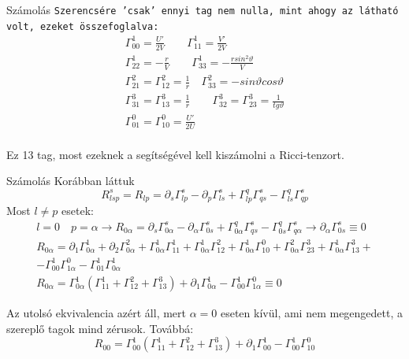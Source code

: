 \documentclass[10pt]{beamer}
\begin{document}
\begin{frame}[t]{Számolás}
\texttt{Szerencsére 'csak' ennyi tag nem nulla, mint ahogy az látható volt, ezeket összefoglalva:}
\begin{gather*}
\Gamma_{00}^{1} = \frac{U'}{2V} \quad \quad \Gamma_{11}^{1} = \frac{V'}{2V} \\
\Gamma_{22}^{1} = -\frac{r}{V} \quad \quad \Gamma_{33}^{1}=-\frac{rsin^{2}\vartheta}{V} \\
\Gamma_{21}^{2} = \Gamma_{12}^{2} = \frac{1}{r} \quad \Gamma_{33}^{2} = -sin\vartheta cos\vartheta \\
\Gamma_{31}^{3} = \Gamma_{13}^{3} = \frac{1}{r} \quad \quad \Gamma_{32}^{3} = \Gamma_{23}^{3} = \frac{1}{tg\vartheta} \\
\Gamma_{01}^{0} = \Gamma_{10}^{0} = \frac{U'}{2U} \\
\end{gather*}
\par Ez 13 tag, most ezeknek a segítségével kell kiszámolni a Ricci-tenzort.
\end{frame}

\begin{frame}[t]{Számolás}
Korábban láttuk $$R^{s}_{lsp} = R_{lp} = \partial_{s}\Gamma_{lp}^{s} - \partial_{p}\Gamma_{ls}^{s} + \Gamma_{lp}^{q}\Gamma_{qs}^{s} - \Gamma_{ls}^{q}\Gamma_{qp}^{s}$$
Most $l \neq p$ esetek:
\begin{gather*}
l = 0 \quad p = \alpha \rightarrow R_{0\alpha} = \partial_{s}\Gamma_{0\alpha}^{s} - \partial_{\alpha}\Gamma_{0s}^{s} + \Gamma_{0\alpha}^{q}\Gamma_{qs}^{s} - \Gamma_{0s}^{q}\Gamma_{q\alpha}^{s}
\rightarrow \partial_{\alpha}\Gamma_{0s}^{s} \equiv 0 \\
R_{0\alpha} = \partial_{1}\Gamma_{0\alpha}^{1} + \partial_{2}\Gamma_{0\alpha}^{2} + \Gamma_{0\alpha}^{1}\Gamma_{11}^{1} + 
\Gamma_{0\alpha}^{1}\Gamma_{12}^{2} + \Gamma_{0\alpha}^{1}\Gamma_{10}^{0} + \Gamma_{0\alpha}^{2}\Gamma_{23}^{3} + 
\Gamma_{0\alpha}^{1}\Gamma_{13}^{3} + \\
 - \Gamma_{00}^{1}\Gamma_{1\alpha}^{0} - \Gamma_{01}^{1}\Gamma_{0\alpha}^{1} \\
R_{0\alpha} = \Gamma_{0\alpha}^{1}(\Gamma_{11}^{1} + \Gamma_{12}^{2} + \Gamma_{13}^{3}) + \partial_{1}\Gamma_{0\alpha}^{1}
- \Gamma_{00}^{1}\Gamma_{1\alpha}^{0} \equiv 0
\end{gather*}
\par Az utolsó ekvivalencia azért áll, mert $\alpha = 0$ eseten kívül, ami nem megengedett, a szereplő tagok mind zérusok. Továbbá:
$$R_{00} = \Gamma_{00}^{1}(\Gamma_{11}^{1} + \Gamma_{12}^{2} + \Gamma_{13}^{3}) + \partial_{1}\Gamma_{00}^{1}
- \Gamma_{00}^{1}\Gamma_{10}^{0}$$
\end{frame}
\end{document}
